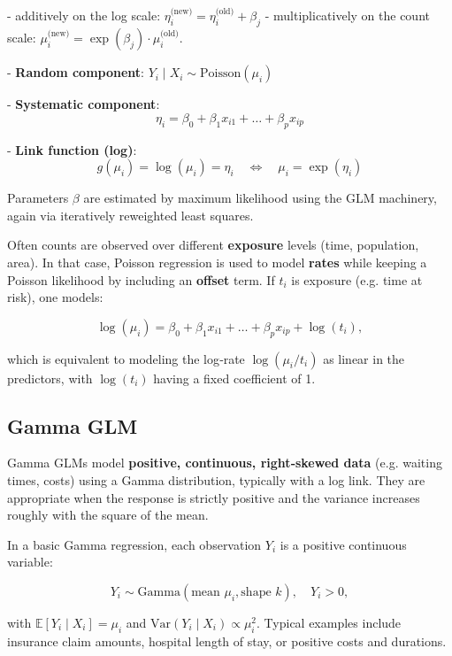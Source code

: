 - additively on the log scale: $\eta_i^\text{(new)} = \eta_i^\text{(old)} + \beta_j$  
- multiplicatively on the count scale: $\mu_i^\text{(new)} = \exp(\beta_j) \cdot \mu_i^\text{(old)}$.



- \textbf{Random component}:  
  $Y_i \mid X_i \sim \text{Poisson}(\mu_i)$  

- \textbf{Systematic component}:  
  \[
  \eta_i = \beta_0 + \beta_1 x_{i1} + \dots + \beta_p x_{ip}
  \]

- \textbf{Link function (log)}:  
  \[
  g(\mu_i) = \log(\mu_i) = \eta_i \quad \Longleftrightarrow \quad \mu_i = \exp(\eta_i)
  \]

Parameters $\beta$ are estimated by maximum likelihood using the GLM machinery, again via iteratively reweighted least squares.



Often counts are observed over different \textbf{exposure} levels (time, population, area). In that case, Poisson regression is used to model \textbf{rates} while keeping a Poisson likelihood by including an \textbf{offset} term. If $t_i$ is exposure (e.g. time at risk), one models:

\[
\log(\mu_i) = \beta_0 + \beta_1 x_{i1} + \dots + \beta_p x_{ip} + \log(t_i),
\]

which is equivalent to modeling the log‑rate $\log(\mu_i / t_i)$ as linear in the predictors, with $\log(t_i)$ having a fixed coefficient of 1.



\subsection{Gamma GLM}

Gamma GLMs model \textbf{positive, continuous, right‑skewed data} (e.g. waiting times, costs) using a Gamma distribution, typically with a log link. They are appropriate when the response is strictly positive and the variance increases roughly with the square of the mean.

In a basic Gamma regression, each observation $Y_i$ is a positive continuous variable:

\[
Y_i \sim \text{Gamma}(\text{mean } \mu_i, \text{shape } k), \quad Y_i > 0,
\]

with $\mathbb{E}[Y_i \mid X_i] = \mu_i$ and $\text{Var}(Y_i \mid X_i) \propto \mu_i^2$. Typical examples include insurance claim amounts, hospital length of stay, or positive costs and durations.



